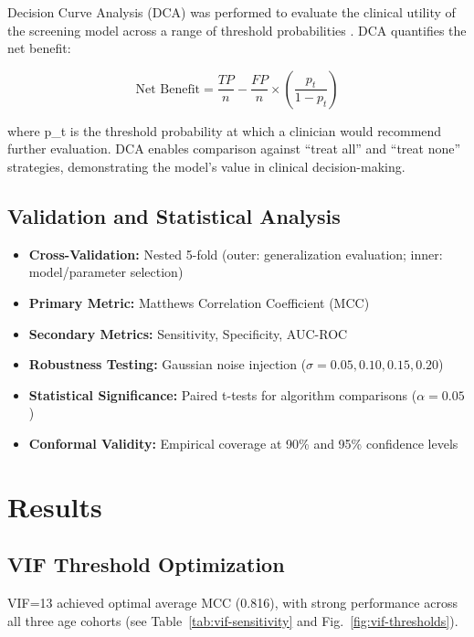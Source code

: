 \documentclass[pdflatex,sn-vancouver-num]{sn-jnl}
\providecommand{\tightlist}{%
  \setlength{\itemsep}{0pt}\setlength{\parskip}{0pt}}
\begin{document}
Decision Curve Analysis (DCA) was performed to evaluate the clinical utility of the screening model across a range of threshold probabilities \cite{ref57}. DCA quantifies the net benefit:

\[
\text{Net Benefit} = \frac{TP}{n} - \frac{FP}{n} \times \left(\frac{p_t}{1-p_t}\right)
\]

where p\_t is the threshold probability at which a clinician would recommend further evaluation. DCA enables comparison against ``treat all'' and ``treat none'' strategies, demonstrating the model's value in clinical decision-making.

\subsection{Validation and Statistical Analysis}\label{validation-and-statistical-analysis}

\begin{itemize}
\tightlist
\item
  \textbf{Cross-Validation:} Nested 5-fold (outer: generalization evaluation; inner: model/parameter selection) \cite{ref58}
\item
  \textbf{Primary Metric:} Matthews Correlation Coefficient (MCC) \cite{ref59}
\item
  \textbf{Secondary Metrics:} Sensitivity, Specificity, AUC-ROC
\item
  \textbf{Robustness Testing:} Gaussian noise injection (\(\sigma = 0.05, 0.10, 0.15, 0.20\))
\item
  \textbf{Statistical Significance:} Paired t-tests for algorithm comparisons (\(\alpha = 0.05\))
\item
  \textbf{Conformal Validity:} Empirical coverage at 90\% and 95\% confidence levels
\end{itemize}

\section{Results}\label{results}

\subsection{VIF Threshold Optimization}\label{vif-threshold-optimization}

VIF=13 achieved optimal average MCC (0.816), with strong performance across all three age cohorts (see Table~\ref{tab:vif-sensitivity} and Fig.~\ref{fig:vif-thresholds}).
\end{document}
